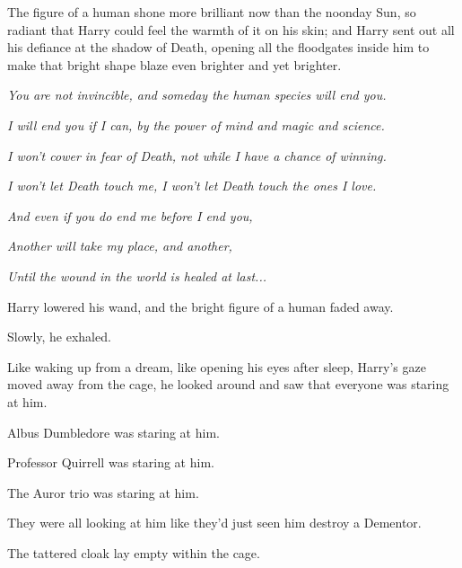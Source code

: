 The figure of a human shone more brilliant now than the noonday Sun, so
radiant that Harry could feel the warmth of it on his skin; and Harry
sent out all his defiance at the shadow of Death, opening all the
floodgates inside him to make that bright shape blaze even brighter and
yet brighter.

\emph{You are not invincible, and someday the human species will end
you.}

\emph{I will end you if I can, by the power of mind and magic and
science.}

\emph{I won't cower in fear of Death, not while I have a chance of
winning.}

\emph{I won't let Death touch me, I won't let Death touch the ones I
love.}

\emph{And even if you do end me before I end you,}

\emph{Another will take my place, and another,}

\emph{Until the wound in the world is healed at last...}

Harry lowered his wand, and the bright figure of a human faded away.

Slowly, he exhaled.

Like waking up from a dream, like opening his eyes after sleep, Harry's
gaze moved away from the cage, he looked around and saw that everyone
was staring at him.

Albus Dumbledore was staring at him.

Professor Quirrell was staring at him.

The Auror trio was staring at him.

They were all looking at him like they'd just seen him destroy a
Dementor.

The tattered cloak lay empty within the cage.
